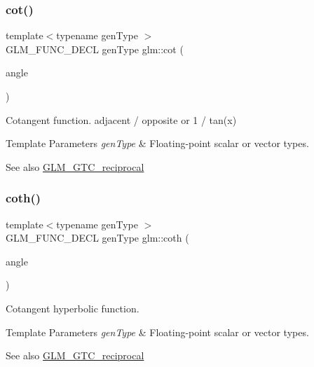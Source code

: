 \subsubsection{\texorpdfstring{cot()}{cot()}}
{\footnotesize\ttfamily template$<$typename gen\+Type $>$ \\
G\+L\+M\+\_\+\+F\+U\+N\+C\+\_\+\+D\+E\+CL gen\+Type glm\+::cot (\begin{DoxyParamCaption}\item[{gen\+Type}]{angle }\end{DoxyParamCaption})}

Cotangent function. adjacent / opposite or 1 / tan(x)


\begin{DoxyTemplParams}{Template Parameters}
{\em gen\+Type} & Floating-\/point scalar or vector types.\\
\hline
\end{DoxyTemplParams}
\begin{DoxySeeAlso}{See also}
\hyperlink{group__gtc__reciprocal}{G\+L\+M\+\_\+\+G\+T\+C\+\_\+reciprocal} 
\end{DoxySeeAlso}
\mbox{\label{group__gtc__reciprocal_ga6b8b770eb7198e4dea59d52e6db81442}} 
\subsubsection{\texorpdfstring{coth()}{coth()}}
{\footnotesize\ttfamily template$<$typename gen\+Type $>$ \\
G\+L\+M\+\_\+\+F\+U\+N\+C\+\_\+\+D\+E\+CL gen\+Type glm\+::coth (\begin{DoxyParamCaption}\item[{gen\+Type}]{angle }\end{DoxyParamCaption})}

Cotangent hyperbolic function.


\begin{DoxyTemplParams}{Template Parameters}
{\em gen\+Type} & Floating-\/point scalar or vector types.\\
\hline
\end{DoxyTemplParams}
\begin{DoxySeeAlso}{See also}
\hyperlink{group__gtc__reciprocal}{G\+L\+M\+\_\+\+G\+T\+C\+\_\+reciprocal} 
\end{DoxySeeAlso}
\mbox{\label{group__gtc__reciprocal_ga59dd0005b6474eea48af743b4f14ebbb}} 
